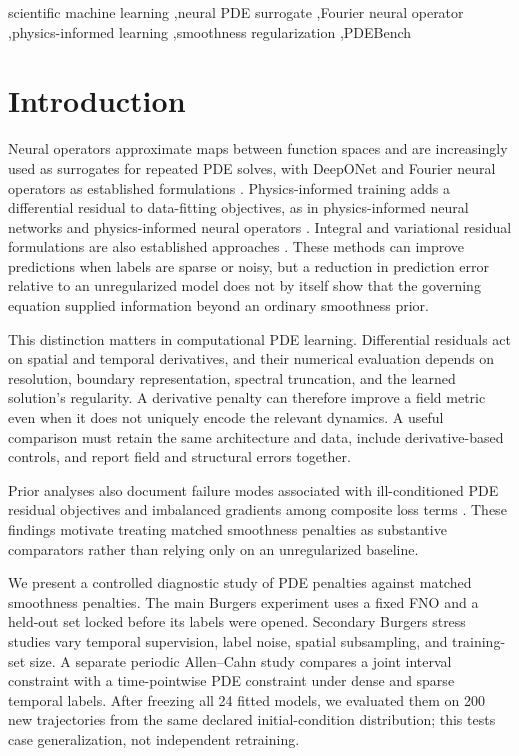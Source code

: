 \documentclass[a4paper,fleqn]{cas-sc}
\begin{document}
\begin{keywords}
scientific machine learning \sep neural PDE surrogate \sep Fourier neural operator
\sep physics-informed learning \sep smoothness regularization \sep PDEBench
\end{keywords}

\maketitle

\section{Introduction}
Neural operators approximate maps between function spaces and are increasingly used as surrogates for repeated PDE solves, with DeepONet and Fourier neural operators as established formulations \citep{lu2021deeponet,kovachki2023neuraloperator,li2021fno,karniadakis2021sciML}. Physics-informed training adds a differential residual to data-fitting objectives, as in physics-informed neural networks and physics-informed neural operators \citep{raissi2019pinn,li2021pino}. Integral and variational residual formulations are also established approaches \citep{kharazmi2021vpinn}. These methods can improve predictions when labels are sparse or noisy, but a reduction in prediction error relative to an unregularized model does not by itself show that the governing equation supplied information beyond an ordinary smoothness prior.

This distinction matters in computational PDE learning. Differential residuals act on spatial and temporal derivatives, and their numerical evaluation depends on resolution, boundary representation, spectral truncation, and the learned solution's regularity. A derivative penalty can therefore improve a field metric even when it does not uniquely encode the relevant dynamics. A useful comparison must retain the same architecture and data, include derivative-based controls, and report field and structural errors together.

Prior analyses also document failure modes associated with ill-conditioned PDE residual objectives and imbalanced gradients among composite loss terms \citep{krishnapriyan2021characterizing,wang2021understanding}. These findings motivate treating matched smoothness penalties as substantive comparators rather than relying only on an unregularized baseline.

We present a controlled diagnostic study of PDE penalties against matched smoothness penalties. The main Burgers experiment uses a fixed FNO and a held-out set locked before its labels were opened. Secondary Burgers stress studies vary temporal supervision, label noise, spatial subsampling, and training-set size. A separate periodic Allen--Cahn study compares a joint interval constraint with a time-pointwise PDE constraint under dense and sparse temporal labels. After freezing all 24 fitted models, we evaluated them on 200 new trajectories from the same declared initial-condition distribution; this tests case generalization, not independent retraining.
\end{document}

